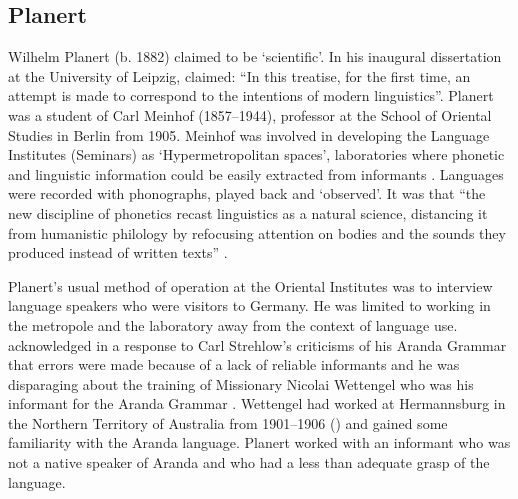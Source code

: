\documentclass[output=paper]{langsci/langscibook}
\begin{document}
\subsection{Planert}

Wilhelm Planert (b. 1882) claimed to be ‘scientific’. In his inaugural dissertation at the University of Leipzig, \citet{planert_syntaktischen_1907} claimed: “In this treatise, for the first time, an attempt is made to correspond to the intentions of modern linguistics”. Planert was a student of Carl Meinhof (1857--1944), professor at the School of Oriental Studies in Berlin from 1905. Meinhof was involved in developing the Language Institutes (Seminars) as ‘Hypermetropolitan spaces’, laboratories where phonetic and linguistic information could be easily extracted from informants \citep[138]{pugach_africa_2012}. Languages were recorded with phonographs, played back and ‘observed’. It was that “the new discipline of phonetics recast linguistics as a natural science, distancing it from humanistic philology by refocusing attention on bodies and the sounds they produced instead of written texts” \citep[93]{pugach_africa_2012}. 

Planert’s usual method of operation at the Oriental Institutes was to interview language speakers who were visitors to Germany. He was limited to working in the metropole and the laboratory away from the context of language use. \citet{planert_erwiderung_1908} acknowledged in a response to Carl Strehlow’s criticisms of his Aranda Grammar that errors were made because of a lack of reliable informants and he was disparaging about the training of Missionary Nicolai Wettengel who was his informant for the Aranda Grammar \citep{planert_australische_1907}.  Wettengel had worked at Hermannsburg in the Northern Territory of Australia from 1901--1906 (\citealt[1154]{strehlow_tale_2011}) and gained some familiarity with the Aranda language. Planert worked with an informant who was not a native speaker of Aranda and who had a less than adequate grasp of the language. 
\end{document}
